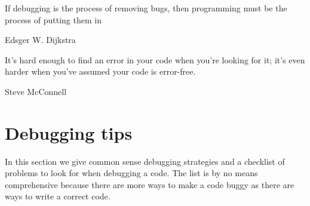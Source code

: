
\epigraph{If debugging is the process of removing bugs, then programming must be the process of putting them in}{Edsger W. Dijkstra}

\epigraph{It's hard enough to find an error in your code when you're looking for it; it's even harder when you've assumed your code is error-free.}{Steve McConnell}

\minitoc

\section{Debugging tips}

In this section we give common sense debugging strategies and a checklist of problems to look for when debugging a code. The list is by no means comprehensive because there are more ways to make a code buggy as there are ways to write a correct code.

